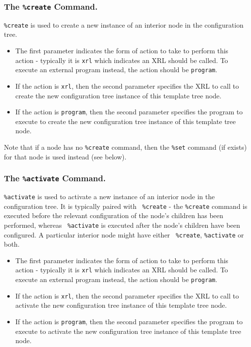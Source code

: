 \documentclass[11pt]{article}
\begin{document}
\subsubsection{The {\tt \%create} Command.}

{\tt \%create} is used to create a new instance of an interior node in
the configuration tree.

\begin{itemize}

  \item The first parameter indicates the form of
  action to take to perform this action - typically it is {\tt xrl}
  which indicates an XRL should be called.
  To execute an external program instead, the action should be {\tt program}.

  \item If the action is {\tt xrl}, then the second parameter specifies the
  XRL to call to create the new configuration tree instance of this template
  tree node.

  \item If the action is {\tt program}, then the second parameter specifies the
  program to execute to create the new configuration tree instance of this
  template tree node. 

\end{itemize}

Note that if a node has no {\tt \%create} command, then the {\tt \%set}
command (if exists) for that node is used instead (see below).

\subsubsection{The {\tt \%activate} Command.}

{\tt \%activate} is used to activate a new instance of an interior
node in the configuration tree.  It is typically paired with {\tt
\%create} - the {\tt \%create} command is executed before the relevant
configuration of the node's children has been performed, whereas {\tt
\%activate} is executed after the node's children have been
configured.  A particular interior node might have either {\tt
\%create}, {\tt \%activate} or both.

\begin{itemize}

  \item The first parameter indicates the form of action to take to perform
  this action - typically it is {\tt xrl} which indicates an XRL should
  be called.
  To execute an external program instead, the action should be {\tt program}.

  \item If the action is {\tt xrl}, then the second parameter specifies the
  XRL to call to activate the new configuration tree instance of this template
  tree node.

  \item If the action is {\tt program}, then the second parameter specifies the
  program to execute to activate the new configuration tree instance of this
  template tree node.

\end{itemize}
\end{document}
